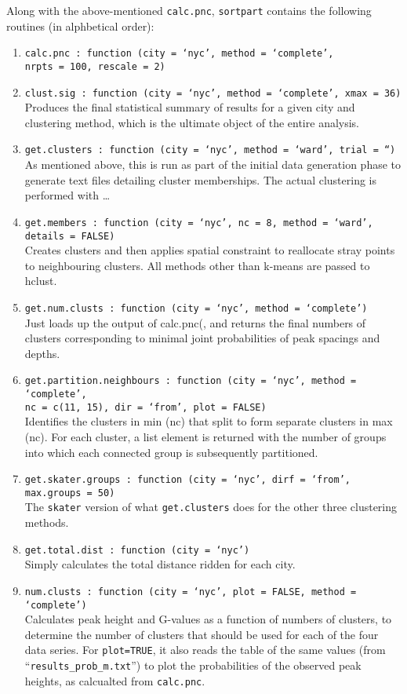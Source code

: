 \documentclass[a4paper,oneside]{article}
\begin{document}
Along with the above-mentioned {\tt calc.pnc}, {\tt sortpart} contains the following routines (in alphbetical order):\\
\begin{enumerate}
    \item {\tt calc.pnc : function (city = `nyc', method = `complete',\\ nrpts = 100, rescale = 2)}
    \item {\tt clust.sig : function (city = `nyc', method = `complete', xmax = 36)}\\ Produces the final statistical summary of results for
        a given city and clustering method, which is the ultimate object of the entire analysis.
    \item {\tt get.clusters : function (city = `nyc', method = `ward', trial = ``)}\\
        As mentioned above, this is run as part of the initial data generation phase to generate text files detailing cluster memberships. The
        actual clustering is performed with \ldots
    \item {\tt get.members : function (city = `nyc', nc = 8, method = `ward', details = FALSE)}\\
        Creates clusters and then applies spatial constraint to reallocate stray points to neighbouring clusters.  All methods other than
        k-means are passed to hclust.
    \item {\tt get.num.clusts : function (city = `nyc', method = `complete')}\\
        Just loads up the output of calc.pnc(, and returns the final numbers of clusters corresponding to minimal joint probabilities of peak
        spacings and depths.  
    \item {\tt get.partition.neighbours : function (city = `nyc', method = `complete',\\
        nc = c(11, 15), dir = `from', plot = FALSE)}\\ 
        Identifies the clusters in min (nc) that split to form separate clusters in max (nc). For each cluster, a list element is returned with
        the number of groups into which each connected group is subsequently partitioned.
    \item {\tt get.skater.groups : function (city = `nyc', dirf = `from', max.groups = 50)}\\
        The {\tt skater} version of what {\tt get.clusters} does for the other three clustering methods.
    \item {\tt get.total.dist : function (city = `nyc')}\\
        Simply calculates the total distance ridden for each city.
    \item {\tt num.clusts : function (city = `nyc', plot = FALSE, method = `complete')}\\
        Calculates peak height and G-values as a function of numbers of clusters, to determine the number of clusters that should be used for
        each of the four data series. For {\tt plot=TRUE}, it also reads the table of the same values (from ``{\tt results\_prob\_m.txt}'') to plot
        the probabilities of the observed peak heights, as calcualted from {\tt calc.pnc}. 
        

\end{enumerate}
\end{document}
